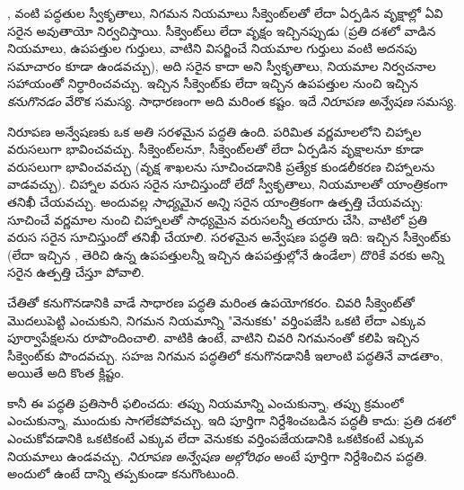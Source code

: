 \documentclass[../../../include/open-logic-section]{subfiles}
\begin{document}


,  వంటి  పద్ధతుల స్వీకృతాలు, నిగమన నియమాలు సీక్వెంట్‌లతో లేదా  ఏర్పడిన వృక్షాల్లో ఏవి సరైన  అవుతాయో నిర్వచిస్తాయి. సీక్వెంట్‌లు లేదా  వృక్షం ఇచ్చినప్పుడు (ప్రతి దశలో వాడిన నియమాలు, ఉపపత్తుల గుర్తులు, వాటిని విసర్జించే నియమాల గుర్తులు వంటి అదనపు సమాచారం కూడా ఉండవచ్చు), అది సరైన  కాదా అని స్వీకృతాలు, నియమాల నిర్వచనాల సహాయంతో నిర్ధారించవచ్చు. ఇచ్చిన సీక్వెంట్‌కు లేదా ఇచ్చిన ఉపపత్తుల నుంచి ఇచ్చిన   \emph{కనుగొనడం} వేరొక సమస్య. సాధారణంగా అది మరింత కష్టం. ఇదే \emph{నిరూపణ అన్వేషణ} సమస్య.

నిరూపణ అన్వేషణకు ఒక అతి సరళమైన పద్ధతి ఉంది.  పరిమిత వర్ణమాలలోని చిహ్నాల వరుసలుగా భావించవచ్చు. సీక్వెంట్‌లనూ, సీక్వెంట్‌లతో లేదా  ఏర్పడిన వృక్షాలనూ కూడా  వరుసలుగా భావించవచ్చు (వృక్ష శాఖలను సూచించడానికి ప్రత్యేక కుండలీకరణ చిహ్నాలను వాడవచ్చు). చిహ్నాల వరుస సరైన  సూచిస్తుందో లేదో స్వీకృతాలు, నియమాలతో యాంత్రికంగా తనిఖీ చేయవచ్చు. అందువల్ల \emph{సాధ్యమైన అన్ని} సరైన  యాంత్రికంగా ఉత్పత్తి చేయవచ్చు:  సూచించే వర్ణమాల నుంచి చిహ్నాలతో సాధ్యమైన వరుసలన్నీ తయారు చేసి, వాటిలో ప్రతి వరుస సరైన  సూచిస్తుందో తనిఖీ చేయాలి. సరళమైన అన్వేషణ పద్ధతి ఇది: ఇచ్చిన సీక్వెంట్‌కు (లేదా ఇచ్చిన , తెరిచి ఉన్న ఉపపత్తులన్నీ ఇచ్చిన ఉపపత్తుల్లోనే ఉండేలా)  దొరికే వరకు అన్ని సరైన  ఉత్పత్తి చేస్తూ పోవాలి.

చేతితో  కనుగొనడానికి వాడే సాధారణ పద్ధతి మరింత ఉపయోగకరం. చివరి సీక్వెంట్‌తో మొదలుపెట్టి  ఎంచుకుని, నిగమన నియమాన్ని "వెనుకకు" వర్తింపజేసి ఒకటి లేదా ఎక్కువ పూర్వాపేక్షలను రూపొందించాలి. వాటికి  ఉంటే, వాటిని చివరి నిగమనంతో కలిపి ఇచ్చిన సీక్వెంట్‌కు  పొందవచ్చు. సహజ నిగమన పద్ధతిలో  కనుగొనడానికీ ఇలాంటి పద్ధతినే వాడతాం, అయితే అది కొంత క్లిష్టం.

కానీ ఈ పద్ధతి ప్రతిసారీ ఫలించదు: తప్పు నియమాన్ని ఎంచుకున్నా,  తప్పు క్రమంలో ఎంచుకున్నా, ముందుకు సాగలేకపోవచ్చు. ఇది పూర్తిగా నిర్దేశించబడిన పద్ధతీ కాదు: ప్రతి దశలో ఎంచుకోవడానికి ఒకటికంటే ఎక్కువ  లేదా వెనుకకు వర్తింపజేయడానికి ఒకటికంటే ఎక్కువ నియమాలు ఉండవచ్చు. \emph{నిరూపణ అన్వేషణ అల్గోరిథం} అంటే పూర్తిగా నిర్దేశించిన పద్ధతి. అందులో  ఉంటే దాన్ని తప్పకుండా కనుగొంటుంది.
\end{document}

